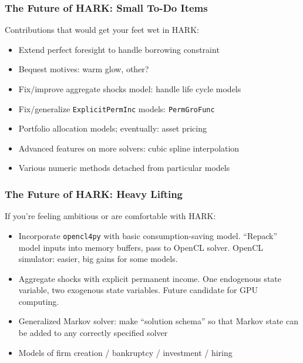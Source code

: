 \documentclass[11ptt]{beamer}
\newcommand{\bi}{\begin{itemize}}
\newcommand{\ei}{\end{itemize}}
\begin{document}
\begin{frame}\label{StructuralChanges}
\frametitle{The Future of HARK: Small To-Do Items}
Contributions that would get your feet wet in HARK:
\bi
\item <1->Extend perfect foresight to handle borrowing constraint

\item <1->Bequest motives: warm glow, other?

\item <2->Fix/improve aggregate shocks model: handle life cycle models

\item <2->Fix/generalize \texttt{ExplicitPermInc} models: \texttt{PermGroFunc}

\item <2->Portfolio allocation models; eventually: asset pricing

\item <3->Advanced features on more solvers: cubic spline interpolation

\item <3->Various numeric methods detached from particular models
\ei
\end{frame}


\begin{frame}
\frametitle{The Future of HARK: Heavy Lifting}
If you're feeling ambitious or are comfortable with HARK:
\bi
\item <1->Incorporate \texttt{opencl4py} with basic consumption-saving model.  ``Repack'' model inputs into memory buffers, pass to OpenCL solver.  OpenCL simulator: easier, big gains for some models.

\item <2->Aggregate shocks with explicit permanent income.  One endogenous state variable, two exogenous state variables.  Future candidate for GPU computing.

\item <3->Generalized Markov solver: make ``solution schema'' so that Markov state can be added to any correctly specified solver

\item <4->Models of firm creation / bankruptcy / investment / hiring
\ei

\hyperlink{DiscussionTopics}{}
\end{frame}
\end{document}
